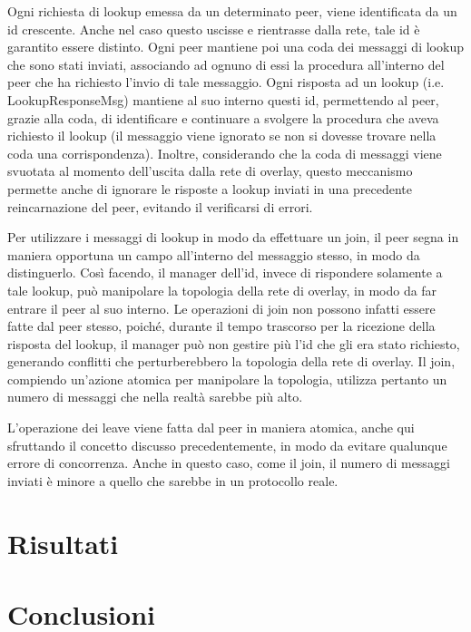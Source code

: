 \documentclass[prodmode,acmtap]{acmlarge}
\begin{document}
Ogni richiesta di lookup emessa da un determinato peer, viene identificata da un id crescente. Anche nel caso questo uscisse e rientrasse dalla rete, tale id è garantito essere distinto. Ogni peer mantiene poi una coda dei messaggi di lookup che sono stati inviati, associando ad ognuno di essi la procedura all'interno del peer che ha richiesto l'invio di tale messaggio. Ogni risposta ad un lookup (i.e. LookupResponseMsg) mantiene al suo interno questi id, permettendo al peer, grazie alla coda, di identificare e continuare a svolgere la procedura che aveva richiesto il lookup (il messaggio viene ignorato se non si dovesse trovare nella coda una corrispondenza). Inoltre, considerando che la coda di messaggi viene svuotata al momento dell'uscita dalla rete di overlay, questo meccanismo permette anche di ignorare le risposte a lookup inviati in una precedente reincarnazione del peer, evitando il verificarsi di errori.

Per utilizzare i messaggi di lookup in modo da effettuare un join, il peer segna in maniera opportuna un campo all'interno del messaggio stesso, in modo da distinguerlo. Così facendo, il manager dell'id, invece di rispondere solamente a tale lookup, può manipolare la topologia della rete di overlay, in modo da far entrare il peer al suo interno. Le operazioni di join non possono infatti essere fatte dal peer stesso, poiché, durante il tempo trascorso per la ricezione della risposta del lookup, il manager può non gestire più l'id che gli era stato richiesto, generando conflitti che perturberebbero la topologia della rete di overlay. Il join, compiendo un'azione atomica per manipolare la topologia, utilizza pertanto un numero di messaggi che nella realtà sarebbe più alto. 

L'operazione dei leave  viene fatta dal peer in maniera atomica, anche qui sfruttando il concetto discusso precedentemente, in modo da evitare qualunque errore di concorrenza. Anche in questo caso, come il join, il numero di messaggi inviati è minore a quello che sarebbe in un protocollo reale.


\section{Risultati} \label{risultati}


\section{Conclusioni} \label{conclusioni}
\end{document}
